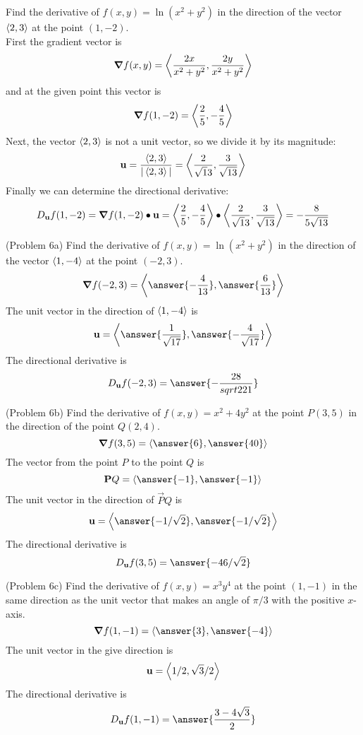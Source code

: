 \documentclass[handout]{ximera}
\begin{document}
\begin{example}[Example 6]
Find the derivative of $f(x,y) = \ln(x^2 + y^2)$ in the direction of the vector $\left\langle 2, 3\right\rangle$ at the point $(1, -2)$.\\
First the gradient vector is
\[
\boldsymbol\nabla f(x,y) = \left\langle \frac{2x}{x^2 +y^2}, \frac{2y}{x^2 +y^2}\right\rangle
\]
and at the given point this vector is
\[
\boldsymbol\nabla f(1,-2) = \left\langle \frac{2}{5}, -\frac{4}{5}\right\rangle
\]
Next, the vector $\left\langle 2, 3\right\rangle$ is not a unit vector, so we divide it by its magnitude:
\[
\mathbf u = \frac{\left\langle 2, 3\right\rangle}{|\left\langle 2, 3\right\rangle|} = \left\langle \frac{2}{\sqrt 13}, \frac{3}{\sqrt{13}}\right\rangle
\]
Finally we can determine the directional derivative:
\[
D_{\mathbf u} f(1, -2) = \boldsymbol\nabla f(1,-2) \bullet \mathbf u = \left\langle \frac{2}{5}, -\frac{4}{5}\right\rangle \bullet \left\langle \frac{2}{\sqrt 13}, \frac{3}{\sqrt{13}}\right\rangle = -\frac{8}{5\sqrt{13}}
\]
\end{example}

\begin{problem}(Problem 6a)
Find the derivative of $f(x,y) = \ln(x^2 + y^2)$ in the direction of the vector $\left\langle 1, -4\right\rangle$ at the point $(-2, 3)$.\\
\[
\grad f(-2, 3) = \vector{\answer{-\frac{4}{13}}, \answer{\frac{6}{13}}}
\]
The unit vector in the direction of $\left\langle 1, -4\right\rangle$ is
\[
\vec u =  \vector{\answer{\frac{1}{\sqrt{17}}}, \answer{-\frac{4}{\sqrt{17}}}}
\]
The directional derivative is
\[
D_{\vec u} f(-2, 3) = \answer{-\frac{28}{sqrt{221}}}
\]
\end{problem}

\begin{problem}(Problem 6b)
Find the derivative of $f(x,y) = x^2 + 4y^2$ at the point $P(3, 5)$ in the direction of the point $Q(2,4)$.\\
\[
\grad f(3, 5) = \vector{\answer{6}, \answer{40}}
\]
The vector from the point $P$ to the point $Q$ is
\[
\vec PQ = \vector{\answer{-1}, \answer{-1}}
\]
The unit vector in the direction of $\vec PQ$ is
\[
\vec u = \vector{\answer{-1/\sqrt 2}, \answer{-1/\sqrt 2}}
\]
The directional derivative is
\[
D_{\vec u} f(3, 5) = \answer{-46/\sqrt 2}
\]

\end{problem}

\begin{problem}(Problem 6c)
Find the derivative of $f(x,y) = x^3 y^4$ at the point $(1,-1)$ in the same direction as the 
unit vector that makes an angle of $\pi/3$ with the positive $x$-axis.\\
\[
\grad f(1, -1) = \vector{\answer{3}, \answer{-4}}
\]
The unit vector in the give direction is
\[
\mathbf u = \left\langle 1/2, \sqrt{3} /2\right\rangle
\]
The directional derivative is
\[
D_{\vec u} f(1, -1) = \answer{\frac{3-4\sqrt 3}{2}}
\]
\end{problem}
\end{document}
